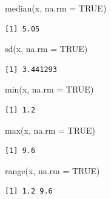 \documentclass[
]{book}
\newenvironment{Shaded}{\begin{snugshade}}{\end{snugshade}}
\newcommand{\AttributeTok}[1]{\textcolor[rgb]{0.77,0.63,0.00}{#1}}
\newcommand{\ConstantTok}[1]{\textcolor[rgb]{0.00,0.00,0.00}{#1}}
\newcommand{\FunctionTok}[1]{\textcolor[rgb]{0.00,0.00,0.00}{#1}}
\newcommand{\NormalTok}[1]{#1}
\begin{document}
\begin{Shaded}
\begin{Highlighting}[]
\FunctionTok{median}\NormalTok{(x, }\AttributeTok{na.rm =} \ConstantTok{TRUE}\NormalTok{)}
\end{Highlighting}
\end{Shaded}

\begin{verbatim}
[1] 5.05
\end{verbatim}

\begin{Shaded}
\begin{Highlighting}[]
\FunctionTok{sd}\NormalTok{(x, }\AttributeTok{na.rm =} \ConstantTok{TRUE}\NormalTok{)}
\end{Highlighting}
\end{Shaded}

\begin{verbatim}
[1] 3.441293
\end{verbatim}

\begin{Shaded}
\begin{Highlighting}[]
\FunctionTok{min}\NormalTok{(x, }\AttributeTok{na.rm =} \ConstantTok{TRUE}\NormalTok{)}
\end{Highlighting}
\end{Shaded}

\begin{verbatim}
[1] 1.2
\end{verbatim}

\begin{Shaded}
\begin{Highlighting}[]
\FunctionTok{max}\NormalTok{(x, }\AttributeTok{na.rm =} \ConstantTok{TRUE}\NormalTok{)}
\end{Highlighting}
\end{Shaded}

\begin{verbatim}
[1] 9.6
\end{verbatim}

\begin{Shaded}
\begin{Highlighting}[]
\FunctionTok{range}\NormalTok{(x, }\AttributeTok{na.rm =} \ConstantTok{TRUE}\NormalTok{)}
\end{Highlighting}
\end{Shaded}

\begin{verbatim}
[1] 1.2 9.6
\end{verbatim}
\end{document}

